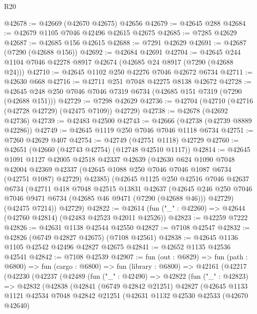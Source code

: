 \begin{lexlean}{R20}
\begin{coremodule}
{@42678 := @42669 (@42670 @42675) @42656
@42679 := @42645 @288
@42684 := @42679 @1105 @7046 @42496 @42615 @42675
@42685 := @7285 @42629
@42687 := @42685 @156 @42615
@42688 := @7291 @42629
@42691 := @42687 (@7290 (@42688 @156))
@42692 := @42684 @42691
@42704 := @42645 @244 @1104 @7046 @42278 @8917 @42674 (@42685 @24 @8917 (@7290 (@42688 @24)))
@42710 := @42645 @1102 @250 @42276 @7046 @42672 @6734
@42711 := @42630 @668
@42716 := @42711 @251 @7048 @42275 @8138 @42672
@42728 := @42645 @248 @250 @7046 @7046 @7319 @6734 (@42685 @151 @7319 (@7290 (@42688 @151)))
@42729 := @7298 @42629
@42736 := @42704 (@42710 (@42716 (@42728 @42729) (@42475 @7109)) @42729)
@42738 := @42678 (@42692 @42736)
@42739 := @42483 @42500
@42743 := @42666 (@42738 (@42739 @8889 @42286))
@42749 := @42645 @1119 @250 @7046 @7046 @1118 @6734
@42751 := @7260 @42629 @407
@42754 := @42749 (@42751 @1118) @42729
@42760 := @42651 (@42660 (@42743 @42754) (@12748 @42510 @1117))
@42814 := @42645
    @1091
    @1127
    @42005
    @42518
    @42337
    @42639
    (@42630
      @624
      @1090
      @7048
      @42004
      @42369
      @42337
      (@42645 @1088 @250 @7046 @7046 @1087 @6734 (@42751 @1087) @42729)
      @42385)
    (@42645
      @1125
      @250
      @42516
      @7046
      @42637
      @6734
      (@42711
        @418
        @7048
        @42515
        @13831
        @42637
        (@42645 @246 @250 @7046 @7046 @9471 @6734 (@42685 @46 @9471 (@7290 (@42688 @46))) @42729)
        (@42475 @7214))
      @42729)
@42822 := @42614 (fun ("_" : @42260) => @42644 (@42760 @42814) (@42483 @42523 @42011 @42526))
@42823 := @42259 @7222
@42826 := @42631 @1138 @42544 @42550
@42827 := @7108 @42547
@42832 := @42826 (@6749 @42827 @42675) (@7108 @42561)
@42838 := @42645 @1136 @1105 @42542 @42496 @42827 @42675
@42841 := @42652 @1135 @42536 @42541
@42842 := @7108 @42539
@42907 := fun (out : @6829) =>
  fun (path : @6800) =>
  fun (cargo : @6800) =>
  fun (library : @6800) =>
  @42161
    (@42217
      (@42230
        (@42237
          (@42489
            (fun ("_" : @42490) =>
            @42822
              (fun ("_" : @42823) =>
              @42832
                (@42838
                  (@42841
                    (@6749 @42842 @21251)
                    @42827
                    (@42645
                      @1133
                      @1121
                      @42534
                      @7048
                      @42842
                      @21251
                      (@42631
                        @1132
                        @42530
                        @42533
                        (@42670 @42640)
}
\end{coremodule}
\end{lexlean}
